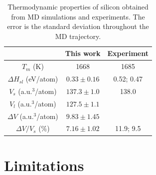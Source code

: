 \documentclass{article}
\begin{document}
\begin{table}[h!]
    \centering
    \caption{Thermodynamic properties of silicon obtained from MD simulations and experiments. The error is the standard deviation throughout the MD trajectory.}
    \begin{tabular}{ccc}
    \toprule
                                & This work        & Experiment \\ \midrule
    $T_m$ (K)                   & 1668             & 1685       \\
    $\Delta H_{sl}$ (eV/atom)   & $0.33 \pm 0.16$  & 0.52; 0.47 \\
    $V_s$ (a.u.$^3$/atom)       & $137.3 \pm 1.0$  & 138.0      \\
    $V_l$ (a.u.$^3$/atom)       & $127.5 \pm 1.1$  &            \\
    $\Delta V$ (a.u.$^3$/atom)  & $9.83 \pm 1.45$  &            \\
    $\Delta V/V_s$ (\%)         & $7.16 \pm 1.02$  & 11.9; 9.5  \\ \bottomrule
    \end{tabular}
\end{table}

\section{Limitations}
\end{document}
